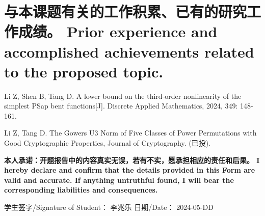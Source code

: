 \documentclass[a4paper,zihao=-4,AutoFakeBold]{ctexart}
\begin{document}
\section{与本课题有关的工作积累、已有的研究工作成绩。
  Prior experience and accomplished achievements
  related to the proposed topic.}
\begin{enumerate}[label={[\arabic{*}]}]
    \item Li Z, Shen B, Tang D. A lower bound on the third-order nonlinearity of the simplest PSap bent functions[J]. Discrete Applied Mathematics, 2024, 349: 148-161.
    \item Li Z, Tang D. The Gowers U3 Norm of Five Classes of Power Permutations with Good Cryptographic Properties, Journal of Cryptography. (已投). 
\end{enumerate}



\vspace{\baselineskip}

\bfseries\fangsong
\noindent
本人承诺：开题报告中的内容真实无误，若有不实，愿承担相应的责任和后果。
I hereby declare and confirm that the details
provided in this Form are valid and accurate.
If anything untruthful found,
I will bear the corresponding liabilities and consequences.

\vspace{\baselineskip}

\noindent
学生签字/Signature of Student： 李兆乐
\hfill
日期/Date： 2024-05-DD
\end{document}
